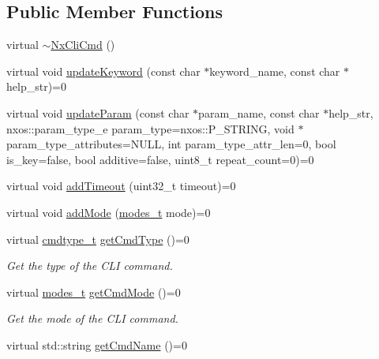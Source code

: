 \subsection*{Public Member Functions}
\begin{DoxyCompactItemize}
\item 
virtual \hyperlink{classnxos_1_1NxCliCmd_a3678e859df1bd42824f5b9f9f1de3b08}{$\sim$NxCliCmd} ()
\item 
virtual void \hyperlink{classnxos_1_1NxCliCmd_aa698fdd1026739307e0710e2948f19f5}{updateKeyword} (const char $\ast$keyword\_\-name, const char $\ast$help\_\-str)=0
\item 
virtual void \hyperlink{classnxos_1_1NxCliCmd_abc9244b0bcf22142b5d784c06a6aa91b}{updateParam} (const char $\ast$param\_\-name, const char $\ast$help\_\-str, nxos::param\_\-type\_\-e param\_\-type=nxos::P\_\-STRING, void $\ast$param\_\-type\_\-attributes=NULL, int param\_\-type\_\-attr\_\-len=0, bool is\_\-key=false, bool additive=false, uint8\_\-t repeat\_\-count=0)=0
\item 
virtual void \hyperlink{classnxos_1_1NxCliCmd_ad4ebfd3ce0e68266bbc22bb4bc7dad0b}{addTimeout} (uint32\_\-t timeout)=0
\item 
virtual void \hyperlink{classnxos_1_1NxCliCmd_a38260da2d6b7a227c4dd027521205c0b}{addMode} (\hyperlink{classnxos_1_1NxCliCmd_a72999b2e8f2995bbb19be346d875e3ce}{modes\_\-t} mode)=0
\item 
\hypertarget{classnxos_1_1NxCliCmd_a5b7df5363b48d84b7f272339facfacac}{
virtual \hyperlink{classnxos_1_1NxCliCmd_a82ed104f13c7859b24d3c0527f706be1}{cmdtype\_\-t} \hyperlink{classnxos_1_1NxCliCmd_a5b7df5363b48d84b7f272339facfacac}{getCmdType} ()=0}
\label{classnxos_1_1NxCliCmd_a5b7df5363b48d84b7f272339facfacac}

\begin{DoxyCompactList}\small\item\em Get the type of the CLI command. \item\end{DoxyCompactList}\item 
\hypertarget{classnxos_1_1NxCliCmd_a3450fa9b31c08c05ad449e12781b0821}{
virtual \hyperlink{classnxos_1_1NxCliCmd_a72999b2e8f2995bbb19be346d875e3ce}{modes\_\-t} \hyperlink{classnxos_1_1NxCliCmd_a3450fa9b31c08c05ad449e12781b0821}{getCmdMode} ()=0}
\label{classnxos_1_1NxCliCmd_a3450fa9b31c08c05ad449e12781b0821}

\begin{DoxyCompactList}\small\item\em Get the mode of the CLI command. \item\end{DoxyCompactList}\item 
\hypertarget{classnxos_1_1NxCliCmd_acf95739336bb525d749a8e73949cb887}{
virtual std::string \hyperlink{classnxos_1_1NxCliCmd_acf95739336bb525d749a8e73949cb887}{getCmdName} ()=0}
\label{classnxos_1_1NxCliCmd_acf95739336bb525d749a8e73949cb887}


\end{DoxyCompactItemize}
